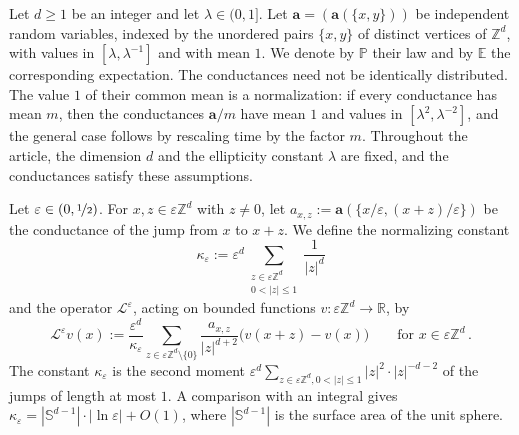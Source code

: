 \documentclass[11pt]{amsart}
\numberwithin{equation}{section}
\newcommand{\Z}{\mathbb{Z}}
\newcommand{\R}{\mathbb{R}}
\newcommand{\E}{\mathbb{E}}
\newcommand{\PP}{\mathbb{P}}
\newcommand{\ba}{\mathbf{a}}
\newcommand{\eps}{\varepsilon}
\newcommand{\Leps}{\mathcal{L}^\varepsilon}
\newcommand{\nf}{\nicefrac}
\begin{document}
Let $d \geq 1$ be an integer and let $\lambda \in (0,1]$.
Let $\ba = (\ba(\{x,y\}))$ be independent random variables, indexed by the unordered pairs $\{x,y\}$ of distinct vertices of $\Z^d$, with values in $[\lambda, \lambda^{-1}]$ and with mean $1$.
We denote by $\PP$ their law and by $\E$ the corresponding expectation.
The conductances need not be identically distributed.
The value $1$ of their common mean is a normalization: if every conductance has mean $m$, then the conductances $\ba/m$ have mean $1$ and values in $[\lambda^2, \lambda^{-2}]$, and the general case follows by rescaling time by the factor $m$.
Throughout the article, the dimension $d$ and the ellipticity constant $\lambda$ are fixed, and the conductances satisfy these assumptions.

Let $\eps \in (0, \nf12)$.
For $x, z \in \eps \Z^d$ with $z \neq 0$, let $a_{x,z} := \ba(\{x/\eps, (x+z)/\eps\})$ be the conductance of the jump from $x$ to $x + z$.
We define the normalizing constant
\begin{equation} \label{eq:def.kappa}
    \kappa_\eps := \eps^d \sum_{\substack{z \in \eps \Z^d \\ 0 < |z| \leq 1}} \frac{1}{|z|^d}
\end{equation}
and the operator $\Leps$, acting on bounded functions $v \colon \eps \Z^d \to \R$, by
\begin{equation} \label{eq:def.Leps}
    \Leps v(x) := \frac{\eps^d}{\kappa_\eps}
    \sum_{z \in \eps \Z^d \setminus \{0\}}
    \frac{a_{x,z}}{|z|^{d+2}}
    \bigl( v(x + z) - v(x) \bigr) \qquad \text{for } x \in \eps \Z^d\,.
\end{equation}
The constant $\kappa_\eps$ is the second moment $\eps^d \sum_{z \in \eps \Z^d, 0 < |z| \leq 1} |z|^2 \cdot |z|^{-d-2}$ of the jumps of length at most $1$.
A comparison with an integral gives $\kappa_\eps = |\mathbb{S}^{d-1}| \cdot |\ln \eps| + O(1)$, where $|\mathbb{S}^{d-1}|$ is the surface area of the unit sphere.
\end{document}
